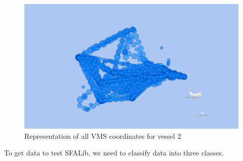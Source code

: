\begin{figure}[]
\centering
\includegraphics[width=0.8\linewidth]{Chapters/img/2All.pdf}
\caption{Representation of all VMS coordinates for vessel 2 }
\label{fig:bi_2_all}
\end{figure}
\newpage
To get data to test SFALib, we need to classify data into three classes.

